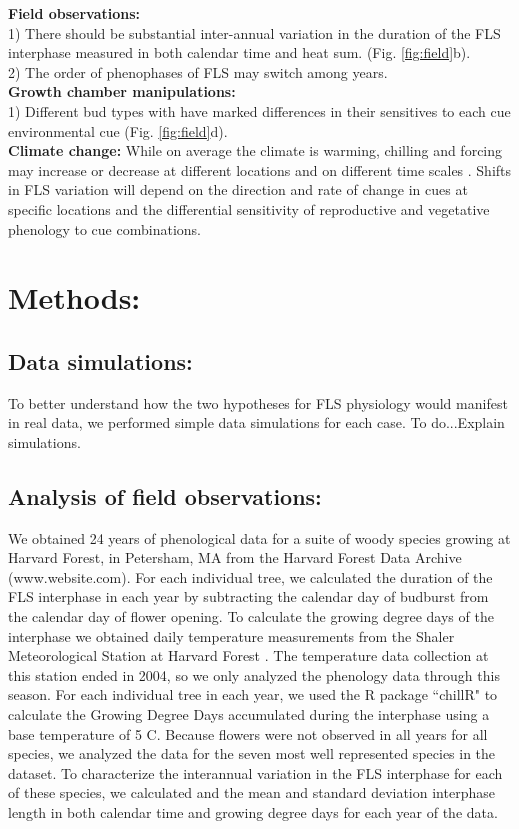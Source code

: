 \documentclass[11pt]{article}
\begin{document}
\noindent \textbf{Field observations:}\\ 1)  There should be substantial inter-annual variation in the duration of the FLS interphase measured in both calendar time and heat sum. (Fig. \ref{fig:field}b).\\ 2) The order of phenophases of FLS may switch among years.\\

\noindent \textbf{Growth chamber manipulations:}\\ 1) Different bud types with have marked differences in their sensitives to each cue environmental cue (Fig. \ref{fig:field}d).\\

\noindent \textbf{Climate change:} While on average the climate is warming, chilling and forcing may increase or decrease at different locations and on different time scales \citep{Ettinger}. Shifts in FLS variation will depend on the direction and rate of change in cues at specific locations and the differential sensitivity of reproductive and vegetative phenology to cue combinations.\\
\section{Methods:}
\subsection*{Data simulations:}
\noindent To better understand how the two hypotheses for FLS physiology would manifest in real data, we performed simple data simulations for each case.  To do...Explain simulations.

\subsection*{Analysis of field observations:}
\noindent We obtained 24 years of phenological data for a suite of woody species growing at Harvard Forest, in Petersham, MA \citep{Okeefe2015} from the Harvard Forest Data Archive (www.website.com).  For each individual tree, we calculated the duration of the FLS interphase in each year by subtracting the calendar day of budburst from the calendar day of flower opening. To calculate the growing degree days of the interphase we obtained daily temperature measurements from the Shaler Meteorological Station at Harvard Forest \citep{}. The temperature data collection at this station ended in 2004, so we only analyzed the phenology data through this season. For each individual tree in each year, we used the R package ``chillR" \citep{} to calculate the Growing Degree Days accumulated during the interphase using a base temperature of 5 \degree C. Because flowers were not observed in all years for all species, we analyzed the data for the seven most well represented species in the dataset. To characterize the interannual variation in the FLS interphase for each of these species, we calculated and the mean and standard deviation interphase length in both calendar time and growing degree days for each year of the data.
\end{document}
